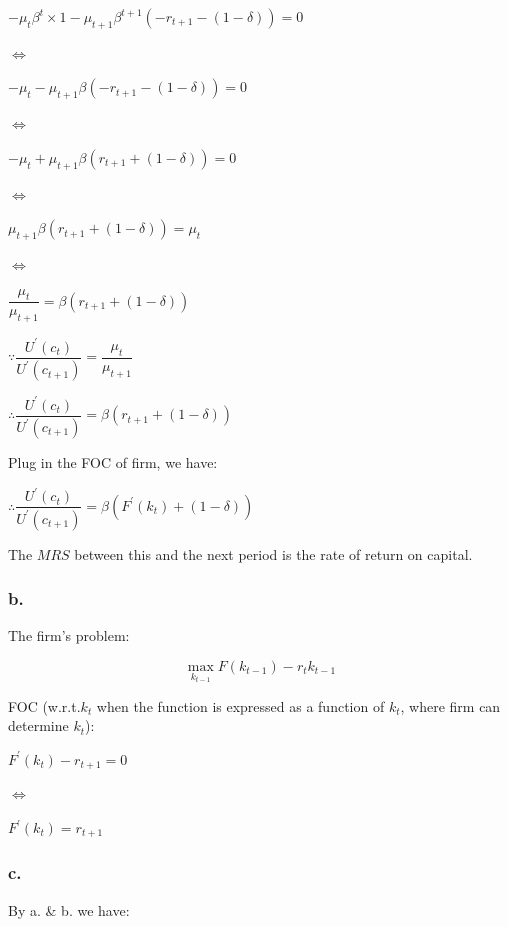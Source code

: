 \documentclass{article}
\begin{document}
$-\mu_{t}\beta^{t}\times1-\mu_{t+1}\beta^{t+1}\left(-r_{t+1}-\left(1-\delta\right)\right)=0$

$\iff$

$-\mu_{t}-\mu_{t+1}\beta\left(-r_{t+1}-\left(1-\delta\right)\right)=0$

$\iff$

$-\mu_{t}+\mu_{t+1}\beta\left(r_{t+1}+\left(1-\delta\right)\right)=0$

$\iff$

$\mu_{t+1}\beta\left(r_{t+1}+\left(1-\delta\right)\right)=\mu_{t}$

$\iff$

$\dfrac{\mu_{t}}{\mu_{t+1}}=\beta\left(r_{t+1}+\left(1-\delta\right)\right)$

$\because\dfrac{U^{\prime}\left(c_{t}\right)}{U^{\prime}\left(c_{t+1}\right)}=\dfrac{\mu_{t}}{\mu_{t+1}}$

$\therefore\dfrac{U^{\prime}\left(c_{t}\right)}{U^{\prime}\left(c_{t+1}\right)}=\beta\left(r_{t+1}+\left(1-\delta\right)\right)$

Plug in the FOC of firm, we have:

$\therefore\dfrac{U^{\prime}\left(c_{t}\right)}{U^{\prime}\left(c_{t+1}\right)}=\beta\left(F^{\prime}\left(k_{t}\right)+\left(1-\delta\right)\right)$

The $MRS$ between this and the next period is the rate of return on capital.

\subsubsection*{\textrm{b.}}

The firm's problem:

\begin{equation*}
    \max_{k_{t-1}}F\left(k_{t-1}\right)-r_{t}k_{t-1}
\end{equation*}

FOC (w.r.t.$k_{t}$ when the function is expressed as a function of $k_{t}$, where firm can determine $k_{t}$):

$F^{\prime}\left(k_{t}\right)-r_{t+1}=0$

$\iff$

$F^{\prime}\left(k_{t}\right)=r_{t+1}$

\subsubsection*{\textrm{c.}}

By \textrm{a.} \& \textrm{b.} we have:
\end{document}
